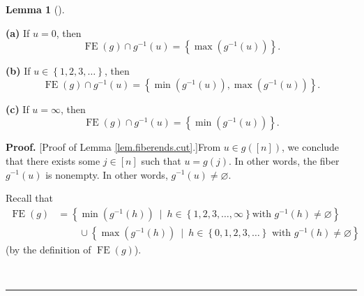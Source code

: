 \documentclass[numbers=enddot,12pt,final,onecolumn,notitlepage]{scrartcl}%
\theoremstyle{definition}
\newtheorem{lem}[theo]{Lemma}
\newenvironment{lemma}[1][]
{\begin{lem}[#1]\begin{leftbar}}
{\end{leftbar}\end{lem}}
\newenvironment{proof}[1][Proof]{\noindent\textbf{#1.} }{\ \rule{0.5em}{0.5em}}
\newenvironment{verlong}{}{}
\begin{document}
\begin{verlong}
\begin{lemma}
\textbf{(a)} If $u=0$, then
\[
\operatorname*{FE}\left(  g\right)  \cap g^{-1}\left(  u\right)  =\left\{
\max\left(  g^{-1}\left(  u\right)  \right)  \right\}  .
\]


\textbf{(b)} If $u\in\left\{  1,2,3,\ldots\right\}  $, then%
\[
\operatorname*{FE}\left(  g\right)  \cap g^{-1}\left(  u\right)  =\left\{
\min\left(  g^{-1}\left(  u\right)  \right)  ,\max\left(  g^{-1}\left(
u\right)  \right)  \right\}  .
\]


\textbf{(c)} If $u=\infty$, then
\[
\operatorname*{FE}\left(  g\right)  \cap g^{-1}\left(  u\right)  =\left\{
\min\left(  g^{-1}\left(  u\right)  \right)  \right\}  .
\]

\end{lemma}

\begin{proof}
[Proof of Lemma \ref{lem.fiberends.cut}.]From $u\in g\left(  \left[  n\right]
\right)  $, we conclude that there exists some $j\in\left[  n\right]  $ such
that $u=g\left(  j\right)  $. In other words, the fiber $g^{-1}\left(
u\right)  $ is nonempty. In other words, $g^{-1}\left(  u\right)
\neq\varnothing$.

Recall that%
\begin{align}
\operatorname*{FE}\left(  g\right)   &  =\left\{  \min\left(  g^{-1}\left(
h\right)  \right)  \ \mid\ h\in\left\{  1,2,3,\ldots,\infty\right\}  \text{
with }g^{-1}\left(  h\right)  \neq\varnothing\right\} \nonumber\\
&  \ \ \ \ \ \ \ \ \ \ \cup\left\{  \max\left(  g^{-1}\left(  h\right)
\right)  \ \mid\ h\in\left\{  0,1,2,3,\ldots\right\}  \text{ with }%
g^{-1}\left(  h\right)  \neq\varnothing\right\}
\label{pf.lem.fiberends.cut.FEg=}%
\end{align}
(by the definition of $\operatorname*{FE}\left(  g\right)  $).


\end{proof}
\end{verlong}
\end{document}
